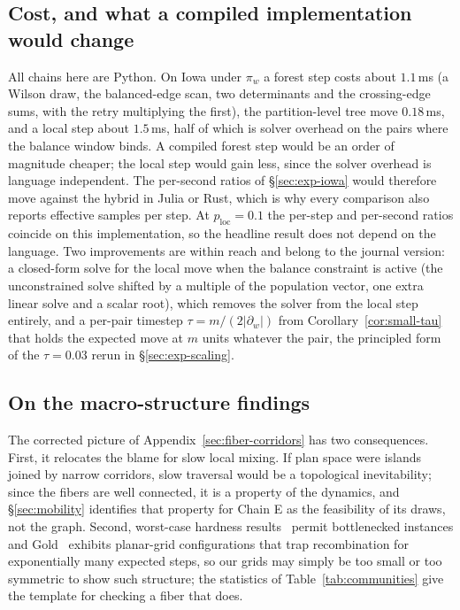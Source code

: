 \documentclass[11pt]{article}
\begin{document}
\subsection{Cost, and what a compiled implementation would change}\label{sec:disc-cost}

All chains here are Python. On Iowa under $\pi_w$ a forest step costs
about $1.1$\,ms (a Wilson draw, the balanced-edge scan, two
determinants and the crossing-edge sums, with the retry multiplying
the first), the partition-level tree move $0.18$\,ms, and a local step
about $1.5$\,ms, half of which is solver overhead on the pairs where
the balance window binds. A compiled forest step would be an order of
magnitude cheaper; the local step would gain less, since the solver
overhead is language independent. The per-second ratios of
\S\ref{sec:exp-iowa} would therefore move against the hybrid in Julia
or Rust, which is why every comparison also reports effective samples
per step. At $p_{\mathrm{loc}} = 0.1$ the per-step and per-second
ratios coincide on this implementation, so the headline result does
not depend on the language. Two improvements are within reach and
belong to the journal version: a closed-form solve for the local move
when the balance constraint is active (the unconstrained solve
shifted by a multiple of the population vector, one extra linear
solve and a scalar root), which removes the solver from the local
step entirely, and a per-pair timestep
$\tau = m / (2|\partial_w|)$ from Corollary~\ref{cor:small-tau} that
holds the expected move at $m$ units whatever the pair, the principled
form of the $\tau = 0.03$ rerun in \S\ref{sec:exp-scaling}.

\subsection{On the macro-structure findings}\label{sec:disc-throats}

The corrected picture of Appendix~\ref{sec:fiber-corridors} has two
consequences. First, it relocates the blame for slow local mixing. If
plan space were islands joined by narrow corridors, slow traversal
would be a topological inevitability; since the fibers are well
connected, it is a property of the dynamics, and \S\ref{sec:mobility}
identifies that property for Chain E as the feasibility of its draws,
not the graph. Second, worst-case hardness
results~\cite{akitaya2022reconfiguration,charikar2023complexity}
permit bottlenecked instances and Gold~\cite{gold2026adversarial}
exhibits planar-grid configurations that trap recombination for
exponentially many expected steps, so our grids may simply be too
small or too symmetric to show such structure; the statistics of
Table~\ref{tab:communities} give the template for checking a fiber
that does.
\end{document}
